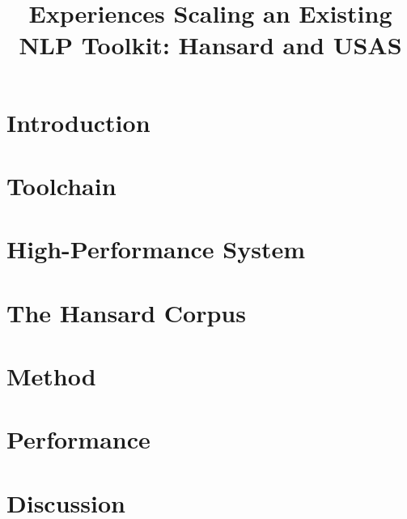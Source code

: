 \documentclass[10pt, a4paper]{article}
\title{Experiences Scaling an Existing NLP Toolkit: Hansard and USAS}
\begin{document}
\maketitleabstract%

\section{Introduction}


\section{Toolchain}



\section{High-Performance System}



\section{The Hansard Corpus}



\section{Method}



\section{Performance}




\section{Discussion}









\end{document}
